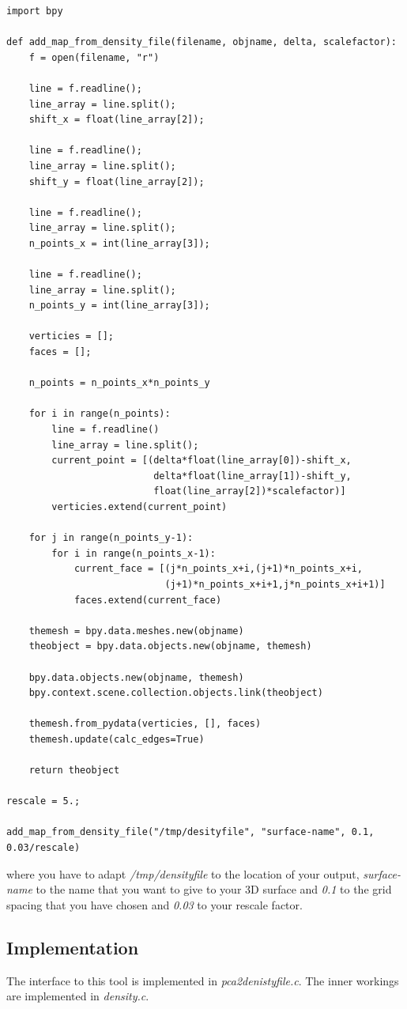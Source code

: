 \begin{lstlisting}
import bpy

def add_map_from_density_file(filename, objname, delta, scalefactor):
    f = open(filename, "r")

    line = f.readline();
    line_array = line.split();
    shift_x = float(line_array[2]);

    line = f.readline();
    line_array = line.split();
    shift_y = float(line_array[2]);

    line = f.readline();
    line_array = line.split();
    n_points_x = int(line_array[3]);

    line = f.readline();
    line_array = line.split();
    n_points_y = int(line_array[3]);

    verticies = [];
    faces = [];

    n_points = n_points_x*n_points_y

    for i in range(n_points):
        line = f.readline()
        line_array = line.split();
        current_point = [(delta*float(line_array[0])-shift_x,
                          delta*float(line_array[1])-shift_y,
                          float(line_array[2])*scalefactor)]
        verticies.extend(current_point)

    for j in range(n_points_y-1):
        for i in range(n_points_x-1):
            current_face = [(j*n_points_x+i,(j+1)*n_points_x+i,
                            (j+1)*n_points_x+i+1,j*n_points_x+i+1)]
            faces.extend(current_face)

    themesh = bpy.data.meshes.new(objname)
    theobject = bpy.data.objects.new(objname, themesh)
    
    bpy.data.objects.new(objname, themesh)
    bpy.context.scene.collection.objects.link(theobject)

    themesh.from_pydata(verticies, [], faces)
    themesh.update(calc_edges=True)

    return theobject

rescale = 5.;

add_map_from_density_file("/tmp/desityfile", "surface-name", 0.1, 0.03/rescale)
\end{lstlisting}
where you have to adapt \emph{/tmp/densityfile} to the location of your
output, \emph{surface-name} to the name that you want to give to your 3D
surface and \emph{0.1} to the grid spacing that you have chosen and
\emph{0.03} to your rescale factor.

\subsection{Implementation}
The interface to this tool is implemented in \emph{pca2denistyfile.c}.
The inner workings are implemented in \emph{density.c}.

